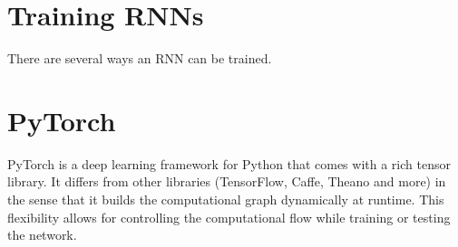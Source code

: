 	\section{Training RNNs}
		There are several ways an RNN can be trained.
		
		
		
	\section{PyTorch}
		PyTorch is a deep learning framework for Python that comes with a rich tensor library.
		It differs from other libraries (TensorFlow, Caffe, Theano and more) in the sense that it builds the computational graph dynamically at runtime.
		This flexibility allows for controlling the computational flow while training or testing the network.
